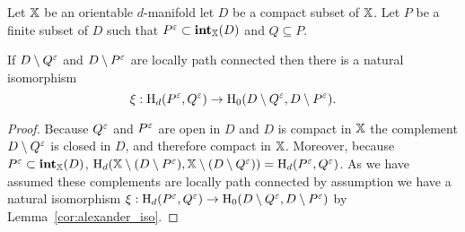 \begin{lemma}\label{lem:duality_apply}
  Let $\mathbb{X}$ be an orientable $d$-manifold let $D$ be a compact subset of $\mathbb{X}$.
  Let $P$ be a finite subset of $D$ such that $P^\varepsilon\subset \mathbf{int}_{\mathbb{X}}(D)$ and $Q\subseteq P$.

  If $D\setminus Q^\varepsilon$ and $D\setminus P^\varepsilon$ are locally path connected then there is a natural isomorphism
  \[ \xi : \mathrm{H}_d(P^\varepsilon,Q^\varepsilon)\to \mathrm{H}_0(D\setminus Q^\varepsilon, D\setminus P^\varepsilon).\]
\end{lemma}
\begin{proof}
  Because $Q^\varepsilon$ and $P^\varepsilon$ are open in $D$ and $D$ is compact in $\mathbb{X}$ the complement $D\setminus Q^\varepsilon$ is closed in $D$, and therefore compact in $\mathbb{X}$.
  Moreover, because $P^\varepsilon\subset \mathbf{int}_{\mathbb{X}}(D)$, $\mathrm{H}_d(\mathbb{X}\setminus(D\setminus P^\varepsilon), \mathbb{X}\setminus(D\setminus Q^\varepsilon)) = \mathrm{H}_d(P^\varepsilon, Q^\varepsilon)$.
  As we have assumed these complements are locally path connected by assumption we have a natural isomorphism $\xi : \mathrm{H}_d(P^\varepsilon, Q^\varepsilon)\to \mathrm{H}_0(D\setminus Q^\varepsilon, D\setminus P^\varepsilon)$
  by Lemma~\ref{cor:alexander_iso}.
\end{proof}

%
%

